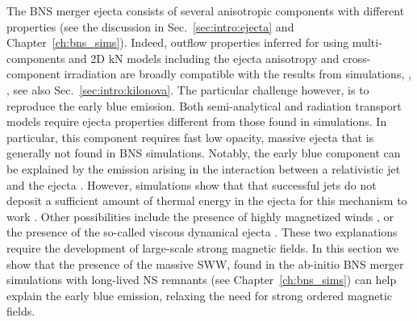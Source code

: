 The \ac{BNS} merger ejecta consists of several anisotropic components with different 
properties (see the discussion in Sec.~\ref{sec:intro:ejecta} and Chapter~\ref{ch:bns_sims}).
%
Indeed, outflow properties inferred for \AT{} using multi-components and 2D \ac{kN} models including the ejecta anisotropy and cross-component irradiation are broadly compatible with the results from simulations, \eg, \citep{Kawaguchi:2018ptg}, see also Sec.~\ref{sec:intro:kilonova}. 
The particular challenge however, is to reproduce the early blue emission. 
Both semi-analytical and radiation transport
models require ejecta properties different from those found in
simulations. In particular, 
this component requires fast low opacity, massive ejecta \citep{Fahlman:2018llv} that is generally 
not found in \ac{BNS} simulations.
Notably, the early blue component can be explained by the emission arising 
in the interaction between a relativistic jet and the ejecta
\citep{Lazzati:2016yxl,Bromberg:2017crh,Piro:2017ayh}.
However, simulations show that that successful jets do not deposit a sufficient amount of thermal energy in the ejecta for this mechanism to work \citep{Duffell:2018iig}. 
Other possibilities include the presence of highly magnetized winds \citep{Metzger:2018uni,Fernandez:2018kax},
or the presence of the so-called viscous dynamical ejecta \citep{Radice:2018ghv}.
These two explanations require the development of large-scale strong magnetic fields.
In this section we show that the presence of the massive \ac{SWW},
found in the ab-initio \ac{BNS} merger simulations with long-lived \ac{NS} remnants 
(see Chapter~\ref{ch:bns_sims}) can help explain the early blue emission, 
relaxing the need for strong ordered magnetic fields. 



